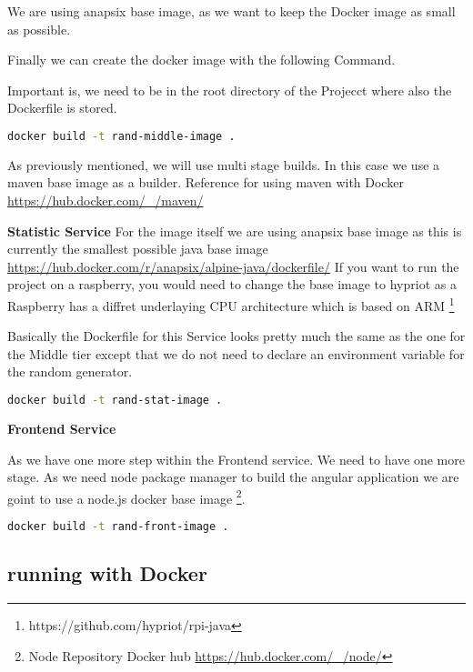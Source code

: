 We are using anapsix base image, as we want to keep the Docker image as small as possible.

Finally we can create the docker image with the following Command.

Important is, we need to be in the root directory of the Projecct where also the Dockerfile is stored.
\begin{lstlisting}[language=Bash]
docker build -t rand-middle-image .
\end{lstlisting}
As previously mentioned, we will use multi stage builds. In this case we use a maven base image as a builder.
Reference for using maven with Docker \url{https://hub.docker.com/_/maven/}

\textbf{Statistic Service}
For the image itself we are using anapsix base image as this is currently the smallest possible java base image \url{https://hub.docker.com/r/anapsix/alpine-java/dockerfile/}
If you want to run the project on a raspberry, you would need to change the base image to hypriot as a Raspberry has a diffret underlaying CPU architecture which is based on ARM \footnote{https://github.com/hypriot/rpi-java}



Basically the Dockerfile for this Service looks pretty much the same as the one for the Middle tier except that we do not need to declare an environment variable for the random generator.

\begin{lstlisting}[language=Bash]
docker build -t rand-stat-image .
\end{lstlisting}

\textbf{Frontend Service}

As we have one more step within the Frontend service. We need to have one more stage. As we need node package manager to build the angular application we are goint to use a node.js docker base image \footnote{ Node Repository Docker hub \url{https://hub.docker.com/_/node/}}.




\begin{lstlisting}[language=Bash]
docker build -t rand-front-image .
\end{lstlisting}


\subsection{running with Docker}

